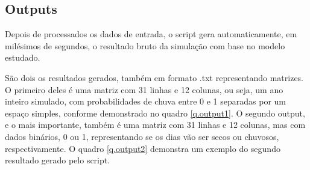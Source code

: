 \subsection{Outputs}
\label{ss.outputs}
Depois de processados os dados de entrada, o script gera automaticamente, em milésimos de segundos, o resultado bruto da simulação com base no modelo estudado.

São dois os resultados gerados, também em formato .txt representando matrizes. O primeiro deles é uma matriz com 31 linhas e 12 colunas, ou seja, um ano inteiro simulado, com probabilidades de chuva entre 0 e 1 separadas por um espaço simples, conforme demonstrado no quadro \ref{q.output1}. O segundo output, e o mais importante, também é uma matriz com 31 linhas e 12 colunas, mas com dados binários, 0 ou 1, representando se os dias vão ser secos ou chuvosos, respectivamente. O quadro \ref{q.output2} demonstra um exemplo do segundo resultado gerado pelo script.

